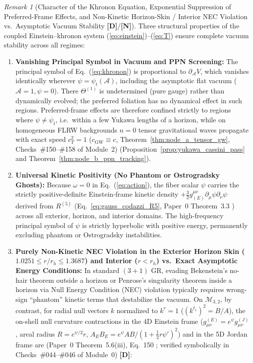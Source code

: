 \documentclass[11pt,a4paper]{article}
\newcommand{\catD}{\textbf{\textcolor{blue!75!black}{[D]}}}
\newcommand{\catN}{\textbf{\textcolor{teal!75!black}{[N]}}}
\theoremstyle{definition}
\theoremstyle{remark}
\newtheorem{remark}[theorem]{Remark}
\begin{document}
\begin{remark}[Character of the Khronon Equation, Exponential Suppression of Preferred-Frame Effects, and Non-Kinetic Horizon-Skin / Interior NEC Violation vs.\ Asymptotic Vacuum Stability \catD/\catN]
\label{rem:khronon_character}
Three structural properties of the coupled Einstein--khronon system (\ref{eq:einstein})--(\ref{eq:T}) ensure complete vacuum stability across all regimes:
\begin{enumerate}
  \item[\textnormal{(i)}] \textbf{Vanishing Principal Symbol in Vacuum and PPN Screening:} The principal symbol of Eq.~(\ref{eq:khronon}) is proportional to $\partial_{\mathcal{A}}V$, which vanishes identically wherever $\psi = \psi_t(\mathcal{A})$, including the asymptotic flat vacuum ($\mathcal{A} = 1, \psi = 0$). There $\Theta^{(1)}$ is undetermined (pure gauge) rather than dynamically evolved; the preferred foliation has no dynamical effect in such regions. Preferred-frame effects are therefore confined strictly to regions where $\psi \neq \psi_t$, i.e.\ within a few Yukawa lengths of a horizon, while on homogeneous FLRW backgrounds $n = 0$ tensor gravitational waves propagate with exact speed $c_T^2 = 1$ ($c_{\text{GW}} \equiv c$, Theorem~\ref{thm:node_a_tensor_gw}, Checks~\#150--\#158 of Module~2) \cite{JacobsonMattingly2001,Blas2011,Abbott2017_GW170817} (Proposition~\ref{prop:yukawa_cassini_pass} and Theorem~\ref{thm:node_b_ppn_tracking}).
  \item[\textnormal{(ii)}] \textbf{Universal Kinetic Positivity (No Phantom or Ostrogradsky Ghosts):} Because $\omega = 0$ in Eq.~(\ref{eq:action}), the fiber scalar $\psi$ carries the strictly positive-definite Einstein-frame kinetic density $+\frac{3}{2}g_{(E)}^{\mu\nu}\partial_{\mu}\psi\partial_{\nu}\psi$ derived from $R^{(5)}$ (Eq.~\ref{eq:gauss_codazzi_R5}, Paper~0 Theorem~3.3 \cite{JV_Paper0}) across all exterior, horizon, and interior domains. The high-frequency principal symbol of $\psi$ is strictly hyperbolic with positive energy, permanently excluding phantom or Ostrogradsky instabilities.
  \item[\textnormal{(iii)}] \textbf{Purely Non-Kinetic NEC Violation in the Exterior Horizon Skin ($1.0251 \le r/r_h \le 1.3687$) and Interior ($r < r_h$) vs.\ Exact Asymptotic Energy Conditions:} In standard $(3+1)$ GR, evading Bekenstein's no-hair theorem outside a horizon or Penrose's singularity theorem inside a horizon via Null Energy Condition (NEC) violation typically requires wrong-sign ``phantom'' kinetic terms that destabilize the vacuum. On $\mathcal{M}_{3,2}$, by contrast, for radial null vectors $k$ normalized to $k^r = 1$ ($(k^{t_1})^2 = B/A$), the on-shell null curvature contractions in the 4D Einstein frame ($g^{(E)}_{\mu\nu} = e^\psi g^{(J)}_{\mu\nu}$, areal radius $R = e^{\psi/2}r$, $A_E B_E = e^\psi A B/(1 + \frac{1}{2}r\psi')^2$) and in the 5D Jordan frame are (Paper~0 Theorem~5.6(iii), Eq.~150 \cite{JV_Paper0}; verified symbolically in Checks~\#044--\#046 of Module~0) \catD:

\end{enumerate}
\end{remark}
\end{document}
